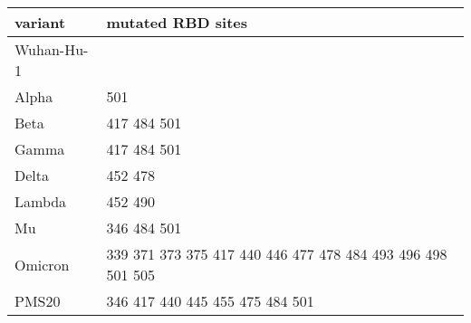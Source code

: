 \begin{tabular}{ll}
\toprule
   variant &                                           mutated RBD sites \\
\midrule
Wuhan-Hu-1 &                                                             \\
     Alpha &                                                         501 \\
      Beta &                                                 417 484 501 \\
     Gamma &                                                 417 484 501 \\
     Delta &                                                     452 478 \\
    Lambda &                                                     452 490 \\
        Mu &                                                 346 484 501 \\
   Omicron & 339 371 373 375 417 440 446 477 478 484 493 496 498 501 505 \\
     PMS20 &                             346 417 440 445 455 475 484 501 \\
\bottomrule
\end{tabular}
